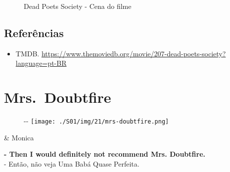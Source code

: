 \begin{figure}
  \centering
    \caption{Dead Poets Society - Cena do filme\label{fig:dead-poets-society-cena-do-filme}}
\end{figure}

\hypertarget{referuxeancias-3}{%
\subsection{Referências}\label{referuxeancias-3}}

\begin{itemize}
\tightlist
\item
  \sloppy TMDB. \url{https://www.themoviedb.org/movie/207-dead-poets-society?language=pt-BR}
\end{itemize}

\hypertarget{mrs.-doubtfire}{%
\section{Mrs.~Doubtfire}\label{mrs.-doubtfire}}

\begin{figure}[!ht]
  \begin{adjustwidth}{-\oddsidemargin-1in}{-\rightmargin}
    \centering
    \texttt{[image: ./S01/img/21/mrs-doubtfire.png]}
  \end{adjustwidth}
\end{figure}

\begin{tcolorbox}[enhanced,center upper,
    drop fuzzy shadow southeast, boxrule=0.3pt,
    lower separated=false, breakable,
    colframe=black!30!dialogoBorder,colback=white]
\begin{minipage}[c]{0.16\linewidth}
   & \centering \scriptsize{Monica}
\end{minipage}
\hfill
\begin{minipage}[c]{0.8\linewidth}
  \textbf{- Then I would definitely not recommend Mrs. Doubtfire.}\\
  - Então, não veja Uma Babá Quase Perfeita.
\end{minipage}
\end{tcolorbox}

